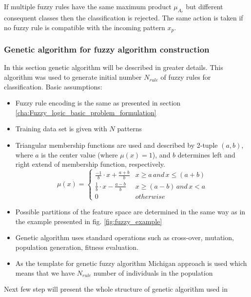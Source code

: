 If multiple fuzzy rules have the same maximum product $\mu_{A_r}$ but different
consequent classes then the classification is rejected. The same action is
taken if no fuzzy rule is compatible with the incoming pattern $x_p$.
\subsubsection{Genetic algorithm for  fuzzy algorithm construction}
\label{cha:Fuzzy_logic_genetic_algorithm}
In this section genetic algorithm will be described in greater details. This
algorithm was used to generate initial number $N_{rule}$ of fuzzy rules for
classification. 
Basic assumptions:
\begin{itemize}
    \item Fuzzy rule encoding is the same as presented in section \ref{cha:Fuzzy_logic_basic_problem_formulation}
    \item Training data set is given with $N$ patterns
    \item Triangular membership functions are used and described by 2-tuple
        $(a, b)$, where $a$ is the center value (where $\mu(x)=1$), and
        $b$ determines left and right extend of membership function, respectively.
        \begin{equation}
            \mu(x) = 
            \begin{cases}
                \frac{-1}{b}\cdot x + \frac{a+b}{b} &
                x \geq a \, and \, x \leq (a+b) \\
                \frac{1}{b}\cdot x - \frac{a-b}{b} &
                x \geq (a - b)\, and\, x < a \\
                0 & otherwise
            \end{cases}
            \label{eq:fuzzy_function}
        \end{equation}
    \item Possible partitions of the feature space are determined in the same
        way as in the example presented in fig. \ref{fig:fuzzy_example}
    \item Genetic algorithm uses standard operations such as cross-over,
        mutation, population generation, fitness evaluation.
    \item As the template for genetic fuzzy algorithm Michigan approach is
        used which means that we have $N_{rule}$ number of individuals in the
        population
\end{itemize}
Next few step will present the whole structure of genetic algorithm used in
